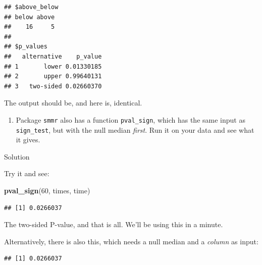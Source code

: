 \documentclass[]{tufte-book}
\newenvironment{Shaded}{}{}
\newcommand{\DecValTok}[1]{\textcolor[rgb]{0.25,0.63,0.44}{#1}}
\newcommand{\KeywordTok}[1]{\textcolor[rgb]{0.00,0.44,0.13}{\textbf{#1}}}
\newcommand{\NormalTok}[1]{#1}
\newcommand{\OperatorTok}[1]{\textcolor[rgb]{0.40,0.40,0.40}{#1}}
\providecommand{\tightlist}{%
  \setlength{\itemsep}{0pt}\setlength{\parskip}{0pt}}
\theoremstyle{definition}
\theoremstyle{definition}
\theoremstyle{definition}
\theoremstyle{remark}
\begin{document}
\begin{Shaded}
\end{Shaded}

\begin{verbatim}
## $above_below
## below above 
##    16     5 
## 
## $p_values
##   alternative    p_value
## 1       lower 0.01330185
## 2       upper 0.99640131
## 3   two-sided 0.02660370
\end{verbatim}

The output should be, and here is, identical.

\begin{enumerate}
\def\labelenumi{(\alph{enumi})}
\setcounter{enumi}{3}
\tightlist
\item
  Package \texttt{smmr} also has a function \texttt{pval\_sign}, which
  has the same input as \texttt{sign\_test}, but with the null median
  \emph{first}. Run it on your data and see what it gives.
\end{enumerate}

Solution

Try it and see:

\begin{Shaded}
\begin{Highlighting}[]
\KeywordTok{pval_sign}\NormalTok{(}\DecValTok{60}\NormalTok{, times, time)}
\end{Highlighting}
\end{Shaded}

\begin{verbatim}
## [1] 0.0266037
\end{verbatim}

The two-sided P-value, and that is all. We'll be using this in a minute.

Alternatively, there is also this, which needs a null median and a
\emph{column} as input:

\begin{Shaded}
\end{Shaded}

\begin{verbatim}
## [1] 0.0266037
\end{verbatim}
\end{document}
